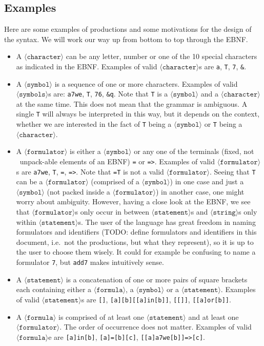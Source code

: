 \documentclass[british]{article}
\newcommand\prv{bc}
\newcommand\m[1]{\texttt{#1}}
\begin{document}
\subsection{Examples}

Here are some examples of productions and some motivations for the
design of the syntax. We will work our way up from bottom to top through
the EBNF.
\begin{itemize}
\item A $\langle\texttt{character}\rangle$ can be any letter, number or
one of the 10 special characters as indicated in the EBNF\@. Examples
of valid $\langle\texttt{character}\rangle$s are \m{a}, \m{T},
\m{7}, \m{&}.
\item A $\langle\texttt{symbol}\rangle$ is a sequence of one or more characters.
Examples of valid $\langle\texttt{symbols}\rangle$s are: \m{a7we},
\m{T}, \m{76}, \m{&q}. Note that \m{T} is a $\langle\texttt{symbol}\rangle$
and a $\langle\texttt{character}\rangle$ at the same time. This does
not mean that the grammar is ambiguous. A single \m{T} will always
be interpreted in this way, but it depends on the context, whether
we are interested in the fact of \m{T} being a $\langle\texttt{symbol}\rangle$
or \m{T} being a $\langle\texttt{character}\rangle$.
\item A $\langle\texttt{formulator}\rangle$ is either a $\langle\texttt{symbol}\rangle$
or any one of the terminals (fixed, not \textquotedbl\ unpack-able\textquotedbl{}
elements of an EBNF) \m{=} or \m{=>}. Examples of valid $\langle\texttt{formulator}\rangle$s
are \m{a7we}, \m{T}, \m{=}, \m{=>}. Note that \m{=T} is not a
valid $\langle\texttt{formulator}\rangle$. Seeing that \m{T} can
be a $\langle\texttt{formulator}\rangle$ (comprised of a $\langle\texttt{symbol}\rangle$)
in one case and just a $\langle\texttt{symbol}\rangle$ (not packed
inside a $\langle\texttt{formulator}\rangle$) in another case, one
might worry about ambiguity. However, having a close look at the EBNF,
we see that $\langle\texttt{formulator}\rangle$s only occur in between
$\langle\texttt{statement}\rangle$s and $\langle\texttt{string}\rangle$s
only within $\langle\texttt{statement}\rangle$s. The user of the
language has great freedom in naming formulators and identifiers (TODO:
define formulators and identifiers in this document, i.e.\ not the
productions, but what they represent), so it is up to the user to
choose them wisely. It could for example be confusing to name a formulator
\m{7}, but \m{add7} makes intuitively sense.
\item A $\langle\texttt{statement}\rangle$ is a concatenation of one or
more pairs of square brackets each containing either a $\langle\texttt{formula}\rangle$,
a $\langle\texttt{symbol}\rangle$ or a $\langle\texttt{statement}\rangle$.
Examples of valid $\langle\texttt{statement}\rangle$s are \m{[]},
\m{[a][b][[a]in[b]]}, \m{[[]]}, \m{[[a]or[b]]}.
\item A $\langle\texttt{formula}\rangle$ is comprised of at least one $\langle\texttt{statement}\rangle$
and at least one $\langle\texttt{formulator}\rangle$. The order of
occurrence does not matter. Examples of valid $\langle\texttt{formula}\rangle$e
are \m{[a]in[b]}, \m{[a]=[b][c]}, \m{[[a]a7we[b]]=>[c]}.
\end{itemize}
\end{document}
